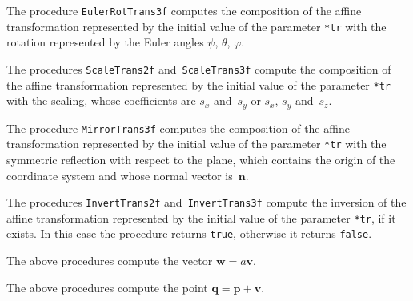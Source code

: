 \vspace{\bigskipamount}
The procedure \texttt{EulerRotTrans3f} computes the composition of the
affine transformation represented by the initial value of the parameter
\texttt{*tr} with the rotation represented by the Euler angles
$\psi$, $\theta$, $\varphi$.

\vspace{\bigskipamount}
The procedures \texttt{ScaleTrans2f} and~\texttt{ScaleTrans3f} compute
the composition of the affine transformation represented by the initial
value of the parameter \texttt{*tr} with the scaling, whose coefficients are
$s_x$ and~$s_y$ or $s_x$, $s_y$ and~$s_z$.

\vspace{\bigskipamount}
The procedure \texttt{MirrorTrans3f} computes the composition of the affine
transformation represented by the initial value of the parameter
\texttt{*tr} with the symmetric reflection with respect to the plane, which
contains the origin of the coordinate system and whose normal vector
is~$\bm{n}$.

\vspace{\bigskipamount}
The procedures \texttt{InvertTrans2f} and~\texttt{InvertTrans3f} compute
the inversion of the affine transformation represented by the initial value
of the parameter \texttt{*tr}, if it exists. In this case the procedure
returns \texttt{true}, otherwise it returns \texttt{false}.

\vspace{\bigskipamount}
The above procedures compute the vector $\bm{w}=a\bm{v}$.

\vspace{\bigskipamount}
The above procedures compute the point $\bm{q}=\bm{p}+\bm{v}$.

